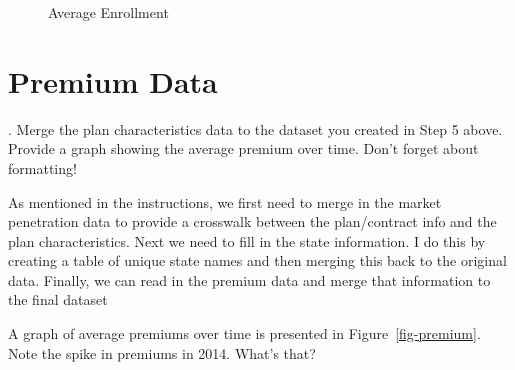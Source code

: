\documentclass[
  letterpaper,
  DIV=11,
  numbers=noendperiod]{scrartcl}
\begin{document}
\begin{figure}


\caption{\label{fig-enroll}Average Enrollment}

\end{figure}%

\newpage

\section{Premium Data}\label{premium-data}

. Merge the plan characteristics data to the dataset you
created in Step 5 above. Provide a graph showing the average premium
over time. Don't forget about formatting!

As mentioned in the instructions, we first need to merge in the market
penetration data to provide a crosswalk between the plan/contract info
and the plan characteristics. Next we need to fill in the state
information. I do this by creating a table of unique state names and
then merging this back to the original data. Finally, we can read in the
premium data and merge that information to the final dataset

A graph of average premiums over time is presented in
Figure~\ref{fig-premium}. Note the spike in premiums in 2014. What's
that?
\end{document}
